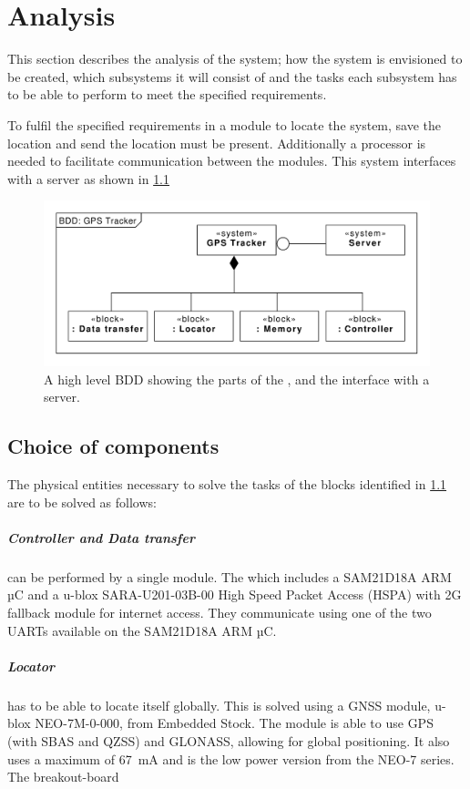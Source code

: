 
\chapter{Analysis}
This section describes the analysis of the system; how the system is envisioned to be created, which subsystems it will consist of and the tasks each subsystem has to be able to perform to meet the specified requirements.

To fulfil the specified requirements in  a module to locate the system, save the location and send the location must be present. Additionally a processor is needed to facilitate communication between the modules. This system interfaces with a server as shown in \cref{fig:BDD:unspecified}

\begin{figure}
	\centering
	\includegraphics[width=0.7\linewidth]{gfx/Design/BDD_Unspecified.pdf}
	\caption{A high level BDD showing the parts of the \systemName, and the interface with a server.}
	\label{fig:BDD:unspecified}
\end{figure}

\section{Choice of components}
The physical entities necessary to solve the tasks of the blocks identified in \cref{fig:BDD:unspecified} are to be solved as follows:

\paragraph{Controller and Data transfer} can be performed by a single module. The \MKR which includes a SAM21D18A ARM µC and a u-blox SARA-U201-03B-00 High Speed Packet Access (HSPA) with 2G fallback module for internet access. They communicate using one of the two UARTs available on the SAM21D18A ARM µC.

\paragraph{Locator} has to be able to locate itself globally. This is solved using a GNSS module, u-blox NEO-7M-0-000, from Embedded Stock.
The module is able to use GPS (with SBAS and QZSS) and GLONASS, allowing for global positioning.
It also uses a maximum of \SI{67}{\milli\ampere} \cite[p.~17]{NEO7_Data} and is the low power version from the NEO-7 series.
The breakout-board
	
